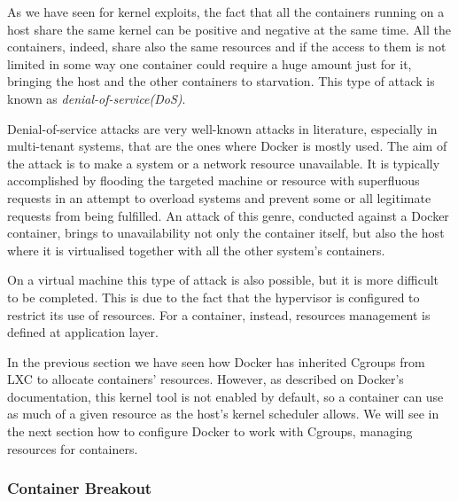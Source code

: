 \documentclass[a4paper,12pt]{article}
\begin{document}
As we have seen for kernel exploits, the fact that all the containers running on
a host share the same kernel can be positive and negative at the same time. All
the containers, indeed, share also the same resources and if the access to them
is not limited in some way one container could require a huge amount just for
it, bringing the host and the other containers to starvation. This type of
attack is known as \textit{denial-of-service(DoS)}.\par Denial-of-service
attacks are very well-known attacks in literature, especially in multi-tenant
systems, that are the ones where Docker is mostly used.  The aim of the attack
is to make a system or a network resource unavailable. It is typically
accomplished by flooding the targeted machine or resource with superfluous
requests in an attempt to overload systems and prevent some or all legitimate
requests from being fulfilled\cite{dos_wikipedia}. An attack of this genre,
conducted against a Docker container, brings to unavailability not only the
container itself, but also the host where it is virtualised together with all
the other system's containers.\par On a virtual machine this type of attack is
also possible, but it is more difficult to be completed. This is due to the fact
that the hypervisor is configured to restrict its use of resources. For a
container, instead, resources management is defined at application layer.\par
In the previous section we have seen how Docker has inherited Cgroups from LXC
to allocate containers' resources. However, as described on Docker's
documentation\cite{resource_on_docker}, this kernel tool is not enabled by
default, so a container can use as much of a given resource as the host's kernel
scheduler allows. We will see in the next section how to configure Docker to
work with Cgroups, managing resources for containers. 


\subsubsection{Container Breakout}
\end{document}
